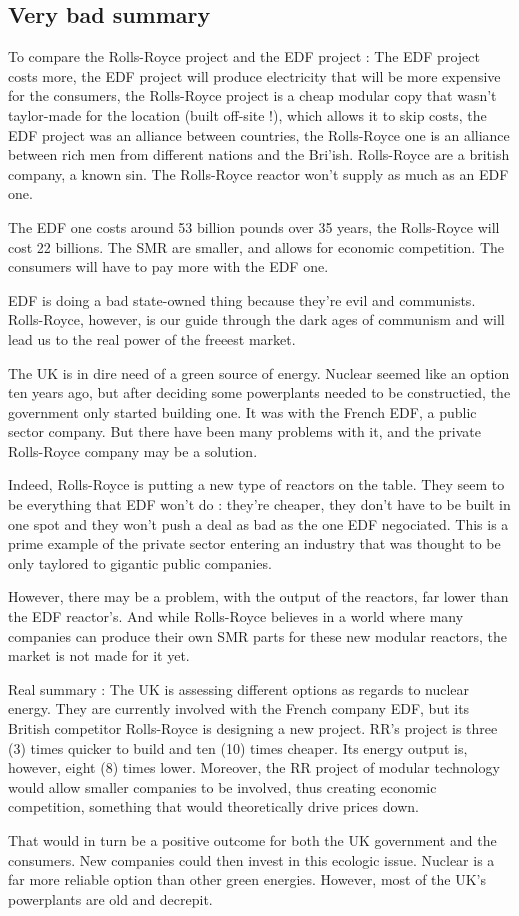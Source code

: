 \documentclass[a4paper,12pt]{book}
\begin{document}
\subsection{Very bad summary}
To compare the Rolls-Royce project and the EDF project : The EDF project costs more, the EDF project will produce electricity that will be more expensive for the consumers, the Rolls-Royce project is a cheap modular copy that wasn't taylor-made for the location (built off-site !), which allows it to skip costs, the EDF project was an alliance between countries, the Rolls-Royce one is an alliance between rich men from different nations and the Bri'ish. Rolls-Royce are a british company, a known sin. The Rolls-Royce reactor won't supply as much as an EDF one.
\par The EDF one costs around 53 billion pounds over 35 years, the Rolls-Royce will cost 22 billions. The SMR are smaller, and allows for economic competition. The consumers will have to pay more with the EDF one.
\par EDF is doing a bad state-owned thing because they're evil and communists. Rolls-Royce, however, is our guide through the dark ages of communism and will lead us to the real power of the freeest market.
\par The UK is in dire need of a green source of energy. Nuclear seemed like an option ten years ago, but after deciding some powerplants needed to be constructied, the government only started building one. It was with the French EDF, a public sector company. But there have been many problems with it, and the private Rolls-Royce company may be a solution.
\par Indeed, Rolls-Royce is putting a new type of reactors on the table. They seem to be everything that EDF won't do : they're cheaper, they don't have to be built in one spot and they won't push a deal as bad as the one EDF negociated. This is a prime example of the private sector entering an industry that was thought to be only taylored to gigantic public companies.
\par However, there may be a problem, with the output of the reactors, far lower than the EDF reactor's. And while Rolls-Royce believes in a world where many companies can produce their own SMR parts for these new modular reactors, the market is not made for it yet.
\par Real summary : The UK is assessing different options as regards to nuclear energy. They are currently involved with the French company EDF, but its British competitor Rolls-Royce is designing a new project. RR's project is three (3) times quicker to build and ten (10) times cheaper. Its energy output is, however, eight (8) times lower. Moreover, the RR project of modular technology would allow smaller companies to be involved, thus creating economic competition, something that would theoretically drive prices down.
\par That would in turn be a positive outcome for both the UK government and the consumers. New companies could then invest in this ecologic issue. Nuclear is a far more reliable option than other green energies. However, most of the UK's powerplants are old and decrepit.
\end{document}
